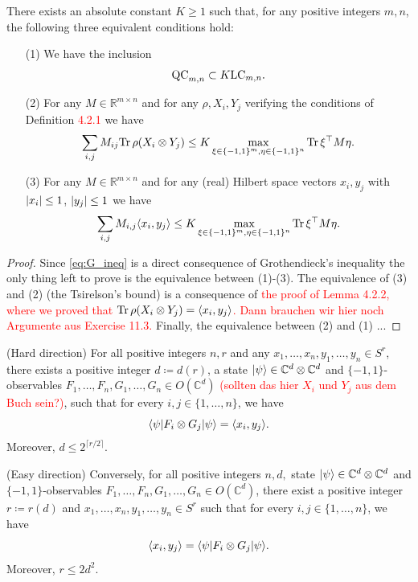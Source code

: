 \begin{theo}
	There exists an absolute constant $K\geq 1$ such that, for any positive integers $m,n$, the following three equivalent conditions hold:
	\begin{itemize}
		\item[(1)] We have the inclusion 
			\begin{equation}
				\textup{QC}_{m,n} \subset K\textup{LC}_{m,n}.
			\end{equation}
		\item[(2)] For any $M\in\mathbb{R}^{m\times n}$ and for any $\rho,X_i,Y_j$ verifying the conditions of Definition \textcolor{red}{4.2.1} we have
			\begin{equation}
				\sum_{i,j} M_{ij} \text{Tr} \, {\rho(X_i\otimes Y_j)} \leq K \max_{\xi\in\{-1,1\}^m,\eta\in\{-1,1\}^n} \text{Tr} \, {\xi^\top M \eta} .
			\end{equation}
			\item[(3)] For any $M\in\mathbb{R}^{m\times n}$ and for any (real) Hilbert space vectors $x_i,y_j$ with ${\left|{x_i}\right|}\leq 1$, ${\left|{y_j}\right|}\leq 1$ we have
				\begin{equation}
					\sum_{i,j} M_{i,j}\langle{x_i},{y_j}\rangle \leq K \max_{\xi\in\{-1,1\}^m,\eta\in\{-1,1\}^n} \text{Tr} \, {\xi^\top M \eta} . \label{eq:G_ineq}
				\end{equation}
	\end{itemize}
\end{theo}
\begin{proof}
	Since \eqref{eq:G_ineq} is a direct consequence of Grothendieck's inequality the only thing left to prove is the equivalence between (1)-(3). The equivalence of (3) and (2) (the Tsirelson's bound) is a consequence of \textcolor{red}{the proof of Lemma \textcolor{red}{4.2.2}, where we proved that $\text{Tr} \, {\rho(X_i\otimes Y_j)}  = \langle{x_i},{y_j}\rangle$.}
	\textcolor{red}{Dann brauchen wir hier noch Argumente aus Exercise 11.3.}
	Finally, the equivalence between (2) and (1) ...
\end{proof}
\begin{theo}[Tsirelson]
	(Hard direction) For all positive integers $n, r$ and any $x_1,\dots,x_n,y_1,\dots,y_n\in S^r$, there exists a positive integer $d\coloneqq d(r)$, a state $\vert {\psi} \rangle\in\mathbb{C}^d\otimes\mathbb{C}^d$ and $\{-1,1\}$-observables $F_1,\dots,F_n,G_1,\dots,G_n\in O(\mathbb{C}^d)$ \textcolor{red}{(sollten das hier $X_i$ und $Y_j$ aus dem Buch sein?)}, such that for every $i,j\in\{1,\dots,n\}$, we have
	\begin{equation}
		\langle {\psi} \vert F_i\otimes G_j \vert {\psi} \rangle = \langle{x_i},{y_j}\rangle.
	\end{equation}
	Moreover, $d\leq 2^{\lceil r/2 \rceil}$.
	
	(Easy direction) Conversely, for all positive integers $n,d,$ state $\vert {\psi} \rangle\in \mathbb{C}^d\otimes\mathbb{C}^d$ and $\{-1,1\}$-observables $F_1,\dots,F_n,G_1,\dots,G_n\in O(\mathbb{C}^d)$, there exist a positive integer $r\coloneqq r(d)$ and $x_1,\dots,x_n,y_1,\dots,y_n\in S^r$ such that for every $i,j\in\{1,\dots,n\}$, we have
	\begin{equation}
		\langle{x_i},{y_j}\rangle = \langle {\psi} \vert F_i\otimes G_j \vert {\psi} \rangle.
	\end{equation}
	Moreover, $r\leq 2d^2$.
\end{theo}

